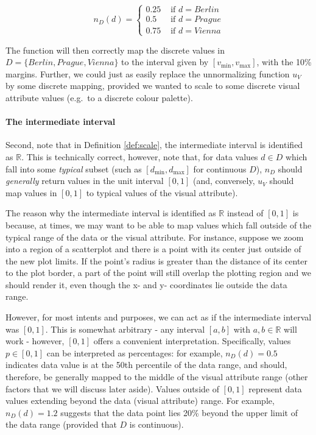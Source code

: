\documentclass[
  openany]{book}
\theoremstyle{definition}
\theoremstyle{definition}
\theoremstyle{definition}
\theoremstyle{definition}
\theoremstyle{remark}
\begin{document}
\[n_D(d) = \begin{cases} 0.25 & \text{ if } d = Berlin \\ 0.5 & \text{ if } d = Prague \\ 0.75 & \text{ if } d = Vienna  \end{cases}\]

The function will then correctly map the discrete values in \(D = \{ Berlin, Prague, Vienna \}\) to the interval given by \([v_{\min}, v_{\max}]\), with the 10\% margins. Further, we could just as easily replace the unnormalizing function \(u_V\) by some discrete mapping, provided we wanted to scale to some discrete visual attribute values (e.g.~to a discrete colour palette).

\paragraph{The intermediate interval}\label{scaling-intermediate}

Second, note that in Definition \ref{def:scale}, the intermediate interval is identified as \(\mathbb{R}\). This is technically correct, however, note that, for data values \(d \in D\) which fall into some \emph{typical} subset (such as \([d_{\min}, d_{\max}]\) for continuous \(D\)), \(n_D\) should \emph{generally} return values in the unit interval \([0, 1]\) (and, conversely, \(u_V\) should map values in \([0, 1]\) to typical values of the visual attribute).

The reason why the intermediate interval is identified as \(\mathbb{R}\) instead of \([0, 1]\) is because, at times, we may want to be able to map values which fall outside of the typical range of the data or the visual attribute. For instance, suppose we zoom into a region of a scatterplot and there is a point with its center just outside of the new plot limits. If the point's radius is greater than the distance of its center to the plot border, a part of the point will still overlap the plotting region and we should render it, even though the x- and y- coordinates lie outside the data range.

However, for most intents and purposes, we can act as if the intermediate interval was \([0, 1]\). This is somewhat arbitrary - any interval \([a, b]\) with \(a, b \in \mathbb{R}\) will work - however, \([0, 1]\) offers a convenient interpretation. Specifically, values \(p \in [0, 1]\) can be interpreted as percentages: for example, \(n_D(d) = 0.5\) indicates data value is at the 50th percentile of the data range, and should, therefore, be generally mapped to the middle of the visual attribute range (other factors that we will discuss later aside). Values outside of \([0, 1]\) represent data values extending beyond the data (visual attribute) range. For example, \(n_D(d) = 1.2\) suggests that the data point lies 20\% beyond the upper limit of the data range (provided that \(D\) is continuous).
\end{document}

